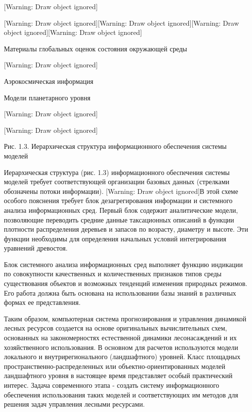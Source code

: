 \documentclass{report}
\begin{document}
[Warning: Draw object ignored]

[Warning: Draw object ignored][Warning: Draw object ignored][Warning: Draw object ignored][Warning: Draw object ignored]



\begin{center}
\begin{minipage}{3.863cm}
Материалы глобальных оценок состояния окружающей среды
\end{minipage}
\end{center}
[Warning: Draw object ignored]

\begin{center}
\begin{minipage}{4.117cm}
Аэрокосмическая информация
\end{minipage}
\end{center}
\begin{center}
\begin{minipage}{3.863cm}
Модели планетарного уровня
\end{minipage}
\end{center}
[Warning: Draw object ignored]

[Warning: Draw object ignored]

Рис. 1.3. Иерархическая  структура информационного обеспечения системы моделей

Иерархическая  структура  (рис. 1.3) информационного обеспечения системы моделей  требует  соответствующей организации
базовых данных (стрелками обозначены потоки информации). [Warning: Draw object ignored]В этой схеме особого пояснения
требует блок дезагрегирования информации и системного анализа информационных сред.  Первый  блок содержит 
аналитические  модели,  позволяющие  переводить  средние данные таксационных описаний  в  функции  плотности 
распределения деревьев и запасов по возрасту, диаметру  и  высоте.  Эти  функции необходимы  для  определения 
начальных  условий  интегрирования уравнений древостоя.

Блок  системного  анализа  информационных  сред  выполняет функцию индикации по совокупности  качественных  и 
количественных признаков типов среды существования объектов и возможных тенденций изменения природных режимов. Его
работа должна быть основана на  использовании базы знаний в различных формах ее представления. 

Таким образом, компьютерная система прогнозирования и управления динамикой лесных ресурсов создается на основе
оригинальных вычислительных схем, основанных на закономерностях естественной динамики лесонасаждений и их
хозяйственного использования. В основном для расчетов используются модели локального и внутрирегионального
(ландшафтного) уровней. Класс площадных пространственно-распределенных или объектно-ориентированных моделей
ландшафтного уровня в настоящее время представляет особый практический интерес.  Задача современного этапа - создать
систему информационного обеспечения использования таких моделей и соответствующих им методов для решения задач
управления лесными ресурсами.  
\end{document}
